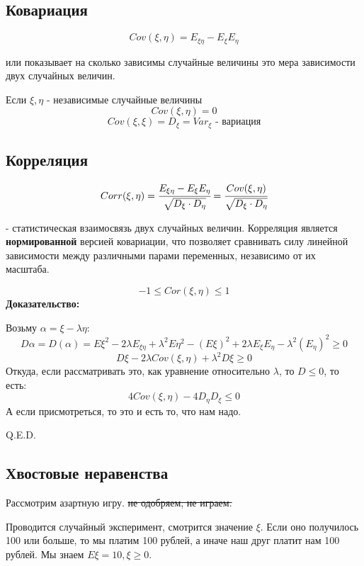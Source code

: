 \subsection{Ковариация}

$$Cov(\xi,\eta) =E_{\xi \eta} -  E_{\xi}E_{\eta}$$

 или  показывает на сколько зависимы случайные величины это мера зависимости двух случайных величин.

Если $\xi, \eta$ - независимые случайные величины
$$Cov(\xi,\eta) = 0$$
$$Cov(\xi,\xi) = D_\xi = Var_\xi \text{ - вариация}$$

\subsection{Корреляция}

$$Corr(\xi,\eta) =\cfrac{E_{\xi \eta} -  E_{\xi}E_{\eta}}{\sqrt{D_{\xi}\cdot D_{\eta}}} = \cfrac{Cov(\xi,\eta)}{\sqrt{D_{\xi}\cdot D_{\eta}}}$$

 - статистическая взаимосвязь двух случайных величин. Корреляция является \textbf{нормированной} версией ковариации, что позволяет сравнивать силу линейной зависимости между различными парами переменных, независимо от их масштаба.

$$-1\leq Cor(\xi,\eta)\leq 1$$
\textbf{Доказательство:}

Возьму $\alpha = \xi - \lambda \eta$:
$$D\alpha = D(\alpha) = E\xi^2 - 2\lambda E_{\xi\eta} + \lambda^2E \eta^2-(E\xi)^2 + 2\lambda E_{\xi}E_{\eta}-\lambda^2(E_\eta)^2\geq 0$$
$$D\xi - 2\lambda Cov(\xi,\eta) + \lambda^2 D\xi \geq 0$$
Откуда, если рассматривать это, как уравнение относительно $\lambda$, то $D\leq 0 $, то есть:
$$4Cov(\xi,\eta) - 4 D_{\eta}D_{\xi}\leq 0$$
А если присмотреться, то это и есть то, что нам надо.

\hfill Q.E.D.

\subsection{Хвостовые неравенства}

Рассмотрим азартную игру. \sout{не одобряем, не играем.} 

Проводится случайный эксперимент, смотрится значение $\xi$. Если оно получилось 100 или больше, то мы платим 100 рублей, а иначе наш друг платит нам 100 рублей. Мы знаем $ E\xi = 10, \xi\geq 0$.

